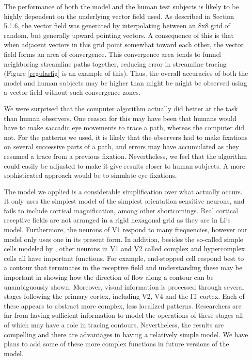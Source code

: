 \documentclass[prodmode,acmtap]{acmlarge}
\begin{document}
The performance of both the model and the human test subjects is
likely to be highly dependent on the underlying vector field used.
As described in Section 5.1.6, the vector field was generated by
interpolating between an 8x8 grid of random, but generally upward
pointing vectors. A consequence of this is that when adjacent vectors
in this grid point somewhat toward each other, the vector field forms
an area of convergence. This convergence area tends to funnel
neighboring streamline paths together, reducing error in streamline
tracing (Figure \ref{regularfig} is an example of this).  Thus, the
overall accuracies of both the model and human subjects may be higher
than might be might be observed using a vector field without such convergence zones.

We were surprised that the computer algorithm actually did better at
the task than human observers. One reason for this may have been that
humans would have to make saccadic eye movements to trace a path,
whereas the computer did not. For the patterns we used, it is likely
that the observers had to make fixations on several successive parts
of a path, and errors may have accumulated as they resumed a trace
from a previous fixation. Nevertheless, we feel that the algorithm
could easily be adjusted to make it give results closer to human
subjects. A more sophisticated approach would be to simulate eye fixations.

The model we applied is a considerable simplification over what
actually occurs. It only uses the simplest model of the simplest
orientation sensitive neurons, and fails to include cortical
magnification, among other shortcomings. Real cortical receptive
fields are not arranged in a rigid hexagonal grid as they are in Li's
model. Furthermore, the neurons of V1 respond to many frequencies,
however our model only uses one in its present form. In addition,
besides the so-called simple cells modeled by , other
neurons in V1 and V2 called complex and hypercomplex cells all have
important functions. For example, end-stopped cell respond best to a
contour that terminates in the receptive field and understanding
these may be important in showing how the direction of flow along a
contour can be unambiguously shown. Moreover, visual information is
processed through several stages following the primary cortex,
including V2, V4 and the IT cortex. Each of these appears to abstract
more complex, less localized patterns. Researchers are far from
having sufficient information to model the operations of these stages
all of which may have a role in tracing contours. Nevertheless, the
results are compelling and there are advantages in having a
relatively simple model. We have plans to add some of these more
complex functions in future versions of the model.
\end{document}
